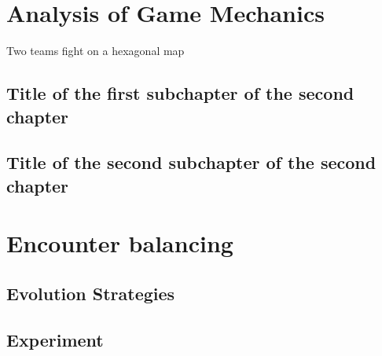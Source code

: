 \chapter{Analysis of Game Mechanics}

Two teams fight on a hexagonal map 


\section{Title of the first subchapter of the second chapter}

\section{Title of the second subchapter of the second chapter}


\chapter{Encounter balancing}

\section{Evolution Strategies}



\section{Experiment}
